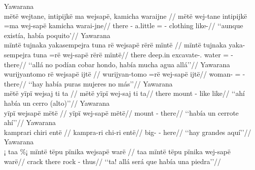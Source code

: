 \documentclass{memoir}
\begin{document}
\pex\label{ex-aff-part-cop-nsubj}    \a Yawarana\\
    \label{convcosnoind-49}        \begingl
        \glpreamble mëtë wejtane, intipijkë ma wejsapë, kamicha waraijne //
        \gla mëtë wej-tane intipijkë =ma wej-sapë kamicha warai-jne//
        \glb there - a.little = - clothing like-//
            \glft ‘‘aunque existía, había poquito’//  
        \endgl 
    \a Yawarana\\
    \label{convfemgrme-284}        \begingl
        \glpreamble mïntë tujnaka yakasempejra tuna rë wejsapë rërë mïntë //
        \gla mïntë tujnaka yaka-sempejra tuna =rë wej-sapë rërë mïntë//
        \glb there deep.in excavate-. water = -  there//
            \glft ‘‘allá no podían cobar hondo, había mucha agua allá’’//  
        \endgl 
    \a Yawarana\\
    \label{conv1stenc-123}        \begingl
        \glpreamble wurijyantomo rë wejsapë ijtë //
        \gla wurijyan-tomo =rë wej-sapë ijtë//
        \glb woman- = - there//
            \glft ‘‘hay había puras mujeres no más’’//  
        \endgl 
    \a Yawarana\\
    \label{ctovarmafl-354}        \begingl
        \glpreamble mëtë yïpï wejsaj ti ta //
        \gla mëtë yïpï wej-saj ti ta//
        \glb there mount - like like//
            \glft ‘‘ahí había un cerro (alto)’’//  
        \endgl 
    \a Yawarana\\
    \label{ctovarmafl-355}        \begingl
        \glpreamble yïpï wejsapë mëtë //
        \gla yïpï wej-sapë mëtë//
        \glb mount - there//
            \glft ‘‘había un cerrote ahí’’//  
        \endgl 
    \a Yawarana\\
    \label{ctovarmafl-453}        \begingl
        \glpreamble kamprari chiri entë //
        \gla kampra-ri chi-ri entë//
        \glb big- - here//
            \glft ‘‘hay grandes aquí’’//  
        \endgl 
    \a Yawarana\\
    \label{histpajirdi-120}        \begingl
        \glpreamble ¡ taa \%¡ mïntë tëpu pïnika wejsapë warë //
        \gla taa mïntë tëpu pïnika wej-sapë warë//
        \glb crack there rock  - thus//
            \glft ‘‘ta! allá será que había una piedra’’//  
        \endgl 
\xe
\end{document}
